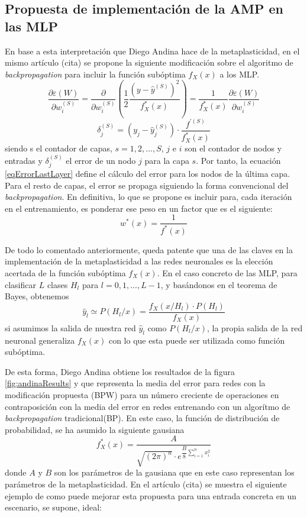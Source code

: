 \documentclass[10pt,a4paper]{report}
\begin{document}
\subsection{Propuesta de implementación de la AMP en las MLP}
En base a esta interpretación que Diego Andina hace de la metaplasticidad, en el mismo artículo (cita) se propone la siguiente modificación sobre el algoritmo de \textit{backpropagation} para incluir la función subóptima $f_X(x)$ a los MLP. 
\begin{equation}
	\dfrac{\partial\varepsilon(W)}{\partial w^{(S)}_i} = \dfrac{\partial}{\partial w^{(S)}_i}\left(\dfrac{1}{2}\dfrac{(y-\widehat{y}^{(S)})^2}{f^*_X(x)}\right) = \dfrac{1}{f^*_X(x)}\dfrac{\partial\varepsilon(W)}{\partial w^{(S)}_i}
\end{equation} 
\begin{equation}
	\label{eqErrorLastLayer}
	\delta_j^{(S)} = (y_j - \widehat{y}^{(S)}_j) \cdot \dfrac{f^{'(S)}}{f^*_X(x)}
\end{equation}
siendo s el contador de capas, $s=1,2,...,S$, $j$ e $i$ son el contador de nodos y entradas y $\delta_j^{(S)}$ el error de un nodo $j$ para la capa $s$. Por tanto, la ecuación \ref{eqErrorLastLayer} define el cálculo del error para los nodos de la última capa. Para el resto de capas, el error se propaga siguiendo la forma convencional del \textit{backpropagation}.
En definitiva, lo que se propone es incluir para, cada iteración en el entrenamiento, es ponderar ese peso en un factor que es el siguiente:
\begin{equation}
	w^*(x) = \dfrac{1}{f^*(x)}
\end{equation}

De todo lo comentado anteriormente, queda patente que una de las claves en la implementación de la metaplasticidad a las redes neuronales es la elección acertada de la función subóptima $f_X(x)$. En el caso concreto de las MLP, para clasificar $L$ clases $H_l$ para $l=0,1,...,L-1$, y basándonos en el teorema de Bayes, obtenemos
\begin{equation}
	\widehat{y}_l \simeq P(H_l/x)=\dfrac{f_X(x/H_l) \cdot P(H_l)}{f_X(x)}
\end{equation}
si asumimos la salida de nuestra red $\widehat{y}_l$ como $P(H_l/x)$, la propia salida de la red neuronal generaliza $f_X(x)$ con lo que esta puede ser utilizada como función subóptima.

De esta forma, Diego Andina obtiene los resultados de la figura \ref{fig:andinaResults} y que representa la media del error para redes con la modificación propuesta (BPW) para un número creciente de operaciones en contraposición con la media del error en redes entrenando con un algorítmo de \textit{backpropagation} tradicional(BP). En este caso, la función de distribución de probabilidad, se ha asumido la siguiente gausiana
\begin{equation}
	f^*_X(x) = \dfrac{A}{\sqrt{(2\pi)^n} \cdot e^{\dfrac{B}{8} \sum_{i=1}^n{x_i^2}}}
\end{equation}
donde $A$ y $B$ son los parámetros de la gausiana que en este caso representan los parámetros de la metaplasticidad. En el artículo (cita) se muestra el siguiente ejemplo de como puede mejorar esta propuesta para una entrada concreta en un escenario, se supone, ideal:
\end{document}
